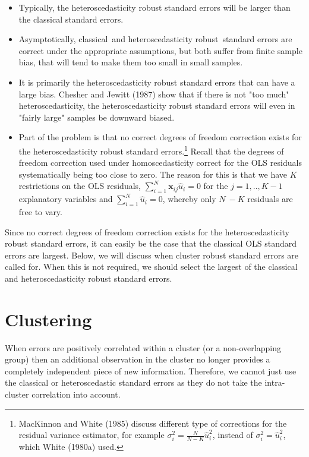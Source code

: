 \documentclass{article}
\begin{document}
\begin{itemize}
\item Typically, the heteroscedasticity robust standard errors will be
larger than the classical standard errors.

\item Asymptotically, classical\ and heteroscedasticity robust\ standard
errors are correct under the appropriate assumptions, but both suffer from
finite sample bias, that will tend to make them too small in small samples.

\item It is primarily the heteroscedasticity robust standard errors that can
have a large bias. Chesher and Jewitt (1987) show that if there is not "too
much" heteroscedasticity, the heteroscedasticity robust standard errors will
even in "fairly large" samples be downward biased.

\item Part of the problem is that no correct degrees of freedom correction
exists for the heteroscedasticity robust standard errors.\footnote{%
MacKinnon and White (1985) discuss different type of corrections for the
residual variance estimator, for example $\sigma _{i}^{2}=\frac{N}{N-K}\hat{u%
}_{i}^{2}$, instead of $\sigma _{i}^{2}=\hat{u}_{i}^{2}$, which White
(1980a) used.} Recall that the degrees of freedom correction used under
homoscedasticity correct for the OLS residuals systematically being too
close to zero. The reason for this is that we have $K$ restrictions on the
OLS residuals, $\sum_{i=1}^{N}\mathbf{x}_{ij}\hat{u}_{i}=0$ for the $%
j=1,..,K-1$ explanatory variables and $\sum_{i=1}^{N}\hat{u}_{i}=0$, whereby
only $N\ -K$ residuals are free to vary.
\end{itemize}

Since no correct degrees of freedom correction exists for the
heteroscedasticity robust standard errors, it can easily be the case that
the classical OLS standard errors are largest. Below, we will discuss when
cluster robust standard errors are called for. When this is not required, we
should select the largest of the classical and heteroscedasticity robust
standard errors.

\section{Clustering}

When errors are positively correlated within a cluster (or a non-overlapping
group) then an additional observation in the cluster no longer provides a
completely independent piece of new information. Therefore, we cannot just
use the classical or heteroscedastic standard errors as they do not take the
intra-cluster correlation into account.
\end{document}
